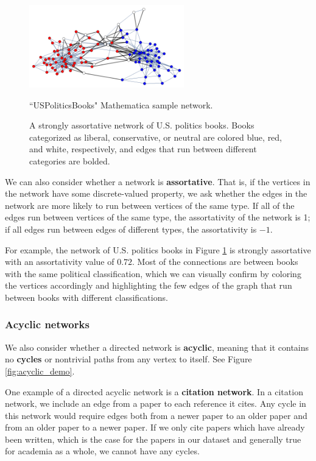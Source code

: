 \documentclass[12pt]{thesis}
\theoremstyle{plain}
\theoremstyle{definition}
\theoremstyle{remark}
\begin{document}
\begin{figure}[t!]
\centering
\includegraphics[width=0.6\textwidth]{assortativity_demo.png}

\scriptsize
``USPoliticsBooks" Mathematica sample network.
\caption{A strongly assortative network of U.S. politics books. Books categorized as liberal, conservative, or neutral are colored blue, red, and white, respectively, and edges that run between different categories are bolded.}
\label{fig:assortativity_demo}
\end{figure}

We can also consider whether a network is \textbf{assortative}. That is, if the vertices in the network have some discrete-valued property, we ask whether the edges in the network are more likely to run between vertices of the same type. If all of the edges run between vertices of the same type, the assortativity of the network is 1; if all edges run between edges of different types, the assortativity is $-1$.

For example, the network of U.S. politics books in Figure \ref{fig:assortativity_demo} is strongly assortative with an assortativity value of $0.72$. Most of the connections are between books with the same political classification, which we can visually confirm by coloring the vertices accordingly and highlighting the few edges of the graph that run between books with different classifications.

\subsubsection{Acyclic networks}

We also consider whether a directed network is \textbf{acyclic}, meaning that it contains no \textbf{cycles} or nontrivial paths from any vertex to itself. See Figure \ref{fig:acyclic_demo}.

One example of a directed acyclic network is a \textbf{citation network}. In a citation network, we include an edge from a paper to each reference it cites. Any cycle in this network would require edges both from a newer paper to an older paper and from an older paper to a newer paper. If we only cite papers which have already been written, which is the case for the papers in our dataset and generally true for academia as a whole, we cannot have any cycles. 
\end{document}
